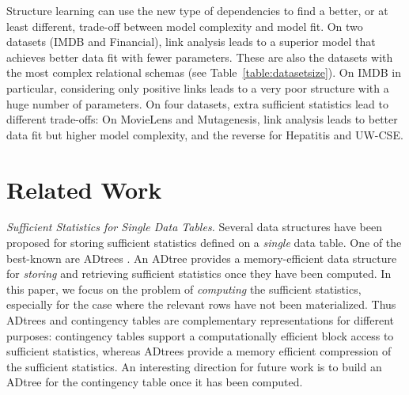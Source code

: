 \documentclass{acm_proc_article-sp}
\begin{document}
\begin{table}[htb]
\begin{center}
\end{center}
\caption{Comparison of Statistical Performance of Bayesian Network Learning.
}
\label{table:result_scores}
\end{table}


Structure learning can use the new type of dependencies to find a better, or at least different, trade-off between model complexity and model fit.
On two datasets (IMDB and Financial), link analysis leads to a superior model that achieves better data fit with fewer parameters. These are also the datasets with the most complex relational schemas (see Table~\ref{table:datasetsize}). On IMDB in particular, considering only positive links leads to a very poor structure with a huge number of parameters.
On four datasets, extra sufficient statistics lead to different trade-offs: On MovieLens and Mutagenesis, link analysis leads to better data fit but higher model complexity, and the reverse for Hepatitis and UW-CSE. 


\section{Related Work} 

{\em Sufficient Statistics for Single Data Tables.} Several data structures have been proposed for storing sufficient statistics defined on a {\em single} data table. 
One of the best-known are ADtrees \cite{Moore1998}. 
An ADtree provides a memory-efficient data structure for {\em storing} and retrieving sufficient statistics once they have been computed. 
In this paper, we focus on the problem of {\em computing} the sufficient statistics, especially for the case where the relevant rows have not been materialized. 
Thus ADtrees and contingency tables are complementary representations for different purposes: contingency tables support a computationally efficient block access to sufficient statistics, whereas ADtrees provide a memory efficient compression of the sufficient statistics. 
An interesting direction for future work is to build an ADtree for the contingency table once it has been computed. 
\end{document}
